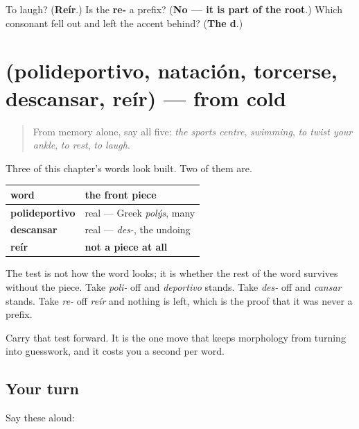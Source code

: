\begin{tcolorbox}[breakable,colback=teal!4,colframe=teal!35!black,title={Before you move on}]
To laugh? (\textbf{Reír}.) Is the \textbf{re-} a prefix? (\textbf{No — it is part of the root}.) Which consonant fell out and left the accent behind? (\textbf{The d}.)
\end{tcolorbox}
\section[(polideportivo, natación, torcerse …]{(polideportivo, natación, torcerse, descansar, reír) — from cold}

\label{lesson:ES-R438-repaso-cuerpo}



\begin{quote}
From memory alone, say all five: \emph{the sports centre}, \emph{swimming}, \emph{to twist your ankle}, \emph{to rest}, \emph{to laugh}.
\end{quote}

\begin{grammarlens}[title={Grammar Lens: pieces that are real, and pieces that are not}]
Three of this chapter's words look built. Two of them are.

\noindent
\begin{tabularx}{\linewidth}{@{}>{\raggedright\arraybackslash}X>{\raggedright\arraybackslash}X@{}}
\toprule
\textbf{word} & \textbf{the front piece} \\
\midrule
\textbf{polideportivo} & real — Greek \emph{polýs}, many \\
\textbf{descansar} & real — \emph{des-}, the undoing \\
\textbf{reír} & \textbf{not a piece at all} \\
\bottomrule
\end{tabularx}

The test is not how the word looks; it is whether the rest of the word survives without the piece. Take \emph{poli-} off and \emph{deportivo} stands. Take \emph{des-} off and \emph{cansar} stands. Take \emph{re-} off \emph{reír} and nothing is left, which is the proof that it was never a prefix.

Carry that test forward. It is the one move that keeps morphology from turning into guesswork, and it costs you a second per word.
\end{grammarlens}

\subsection*{Your turn}
Say these aloud:

